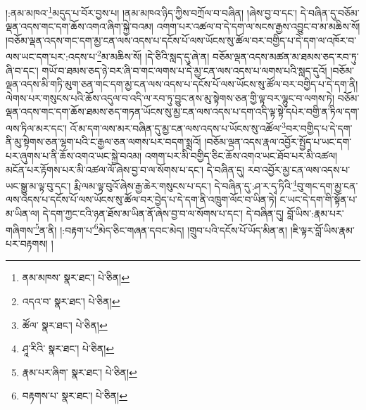 །:ནམ་མཁའ་\footnote{ནམ་མཁས་  སྣར་ཐང་།  པེ་ཅིན། }མདུད་པ་བོར་བྱས་པ། །ནམ་མཁའ་ཉིད་ཀྱིས་བཀྲོལ་བ་བཞིན། །ཞེས་བྱ་བ་དང་། དེ་བཞིན་དུ་བཅོམ་ལྡན་འདས་གང་དག་ཆོས་འགའ་ཞིག་སྐྱེ་བའམ། འགག་པར་འཚལ་བ་དེ་དག་ལ་སངས་རྒྱས་འབྱུང་བ་མ་མཆིས་སོ། །བཅོམ་ལྡན་འདས་གང་དག་མྱ་ངན་ལས་འདས་པ་དངོས་པོ་ལས་ཡོངས་སུ་ཚོལ་བར་བགྱིད་པ་དེ་དག་ལ་འཁོར་བ་ལས་ཡང་དག་པར་:འདས་པ་\footnote{འདའ་བ་  སྣར་ཐང་།  པེ་ཅིན། }མ་མཆིས་སོ། །དེ་ཅིའི་སླད་དུ་ཞེ་ན། བཅོམ་ལྡན་འདས་མཚན་མ་ཐམས་ཅད་རབ་ཏུ་ཞི་བ་དང་། གཡོ་བ་ཐམས་ཅད་ཉེ་བར་ཞི་བ་གང་ལགས་པ་དེ་མྱ་ངན་ལས་འདས་པ་ལགས་པའི་སླད་དུའོ། །བཅོམ་ལྡན་འདས་མི་གཏི་མུག་ཅན་གང་དག་མྱ་ངན་ལས་འདས་པ་དངོས་པོ་ལས་ཡོངས་སུ་ཚོལ་བར་བགྱིད་པ་དེ་དག་ནི། ལེགས་པར་གསུངས་པའི་ཆོས་འདུལ་བ་འདི་ལ་རབ་ཏུ་བྱུང་ནས་མུ་སྟེགས་ཅན་གྱི་ལྟ་བར་ལྷུང་བ་ལགས་ཏེ། བཅོམ་ལྡན་འདས་གང་དག་ཆོས་ཐམས་ཅད་གཏན་ཡོངས་སུ་མྱ་ངན་ལས་འདས་པ་དག་འདི་ལྟ་སྟེ་དཔེར་བགྱི་ན་ཏིལ་དག་ལས་ཏིལ་མར་དང་། འོ་མ་དག་ལས་མར་བཞིན་དུ་མྱ་ངན་ལས་འདས་པ་ཡོངས་སུ་འཚོལ་\footnote{ཚོལ་  སྣར་ཐང་།  པེ་ཅིན། }བར་བགྱིད་པ་དེ་དག་ནི་མུ་སྟེགས་ཅན་ལྷག་པའི་ང་རྒྱལ་ཅན་ལགས་པར་བདག་སྨྲའོ། །བཅོམ་ལྡན་འདས་རྣལ་འབྱོར་སྤྱོད་པ་ཡང་དག་པར་ཞུགས་པ་ནི་ཆོས་འགའ་ཡང་སྐྱེ་བའམ། འགག་པར་མི་བགྱིད་ཅིང་ཆོས་འགའ་ཡང་ཐོབ་པར་མི་འཚལ། མངོན་པར་རྟོགས་པར་མི་འཚལ་ལོ་ཞེས་བྱ་བ་ལ་སོགས་པ་དང་། དེ་བཞིན་དུ། རབ་འབྱོར་མྱ་ངན་ལས་འདས་པ་ཡང་སྒྱུ་མ་ལྟ་བུ་དང་། རྨི་ལམ་ལྟ་བུའོ་ཞེས་རྒྱ་ཆེར་གསུངས་པ་དང་། དེ་བཞིན་དུ་:ཤ་ར་དྭ་ཏིའི་\footnote{ཤཱ་རིའི་  སྣར་ཐང་།  པེ་ཅིན། }བུ་གང་དག་མྱ་ངན་ལས་འདས་པ་དངོས་པོ་ལས་ཡོངས་སུ་ཚོལ་བར་བྱེད་པ་དེ་དག་ནི་འཁྲུག་ལོང་བ་ཡིན་ཏེ། ང་ཡང་དེ་དག་གི་སྟོན་པ་མ་ཡིན་ལ། དེ་དག་ཀྱང་ངའི་ཉན་ཐོས་མ་ཡིན་ནོ་ཞེས་བྱ་བ་ལ་སོགས་པ་དང་། དེ་བཞིན་དུ། བློ་ཡིས་:རྣམ་པར་གཞིགས་\footnote{རྣམ་པར་ཞིག་  སྣར་ཐང་།  པེ་ཅིན། }ན་ནི། །:བརྟག་པ་\footnote{བརྟགས་པ་  སྣར་ཐང་།  པེ་ཅིན། }མེད་ཅིང་གཞན་དབང་མེད། །གྲུབ་པའི་དངོས་པོ་ཡོད་མིན་ན། །ཇི་ལྟར་བློ་ཡིས་རྣམ་པར་བརྟགས། །
